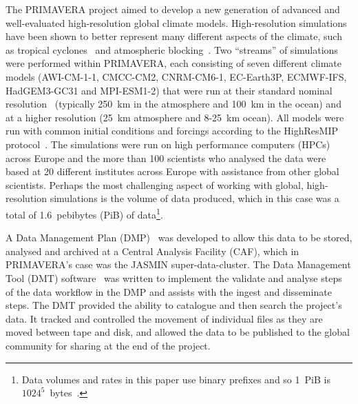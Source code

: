 \documentclass[gmd, manuscript]{copernicus}
\begin{document}


\introduction  %

The PRIMAVERA project aimed to develop a new generation of advanced and well-evaluated high-resolution global climate models. High-resolution simulations have been shown to better represent many different aspects of the climate, such as tropical cyclones~\citep{Roberts2020} and atmospheric blocking~\citep{Schiemann2019}. Two ``streams'' of simulations were performed within PRIMAVERA, each consisting of seven different climate models (AWI-CM-1-1, CMCC-CM2, CNRM-CM6-1, EC-Earth3P, ECMWF-IFS, HadGEM3-GC31 and MPI-ESM1-2) that were run at their standard nominal resolution~\citep{GloablAttr} (typically  250~km in the atmosphere and 100~km in the ocean) and at a higher resolution (25~km atmosphere and 8-25~km ocean). All models were run with common initial conditions and forcings according to the HighResMIP protocol~\citep{Haarsma2016}. The simulations were run on high performance computers (HPCs) across Europe and the more than 100 scientists who analysed the data were based at 20 different institutes across Europe with assistance from other global scientists. Perhaps the most challenging aspect of working with global, high-resolution simulations is the volume of data produced, which in this case was a total of 1.6~pebibytes (PiB) of data\footnote{Data volumes and rates in this paper use binary prefixes and so 1~PiB is $1024^5$~bytes~\citep{IEEE1541}.}. 

A Data Management Plan (DMP)~\citep{Mizielinski2016} was developed to allow this data to be stored, analysed and archived at a Central Analysis Facility (CAF), which in PRIMAVERA's case was the JASMIN super-data-cluster. The Data Management Tool (DMT) software~\citep{Seddon2019} was written to implement the validate and analyse steps of the data workflow in the DMP and assists with the ingest and disseminate steps. The DMT provided the ability to catalogue and then search the project's data. It tracked and controlled the movement of individual files as they are moved between tape and disk, and allowed the data to be published to the global community for sharing at the end of the project.
\end{document}

